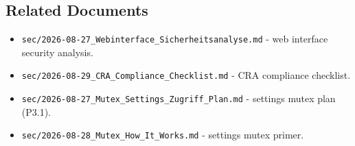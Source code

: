 \subsection{Related Documents}

\begin{itemize}
    \item \texttt{sec/2026-08-27\_Webinterface\_Sicherheitsanalyse.md} - web interface security analysis.
    \item \texttt{sec/2026-08-29\_CRA\_Compliance\_Checklist.md} - CRA compliance checklist.
    \item \texttt{sec/2026-08-27\_Mutex\_Settings\_Zugriff\_Plan.md} - settings mutex plan (P3.1).
    \item \texttt{sec/2026-08-28\_Mutex\_How\_It\_Works.md} - settings mutex primer.
\end{itemize}
